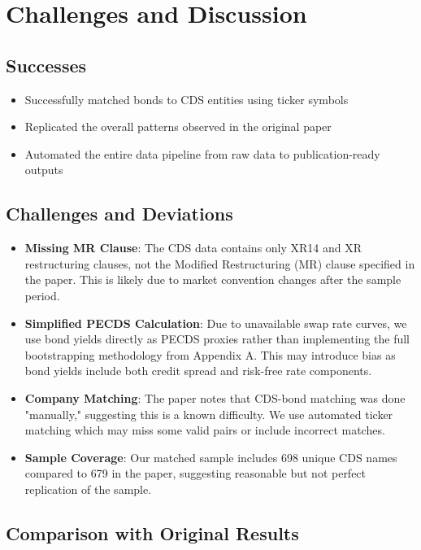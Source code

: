 \documentclass{article}
\begin{document}
\section{Challenges and Discussion}

\subsection{Successes}
\begin{itemize}
    \item Successfully matched bonds to CDS entities using ticker symbols
    \item Replicated the overall patterns observed in the original paper
    \item Automated the entire data pipeline from raw data to publication-ready outputs
\end{itemize}

\subsection{Challenges and Deviations}
\begin{itemize}
    \item \textbf{Missing MR Clause}: The CDS data contains only XR14 and XR restructuring clauses, not the Modified Restructuring (MR) clause specified in the paper. This is likely due to market convention changes after the sample period.
    
    \item \textbf{Simplified PECDS Calculation}: Due to unavailable swap rate curves, we use bond yields directly as PECDS proxies rather than implementing the full bootstrapping methodology from Appendix A. This may introduce bias as bond yields include both credit spread and risk-free rate components.
    
    \item \textbf{Company Matching}: The paper notes that CDS-bond matching was done "manually," suggesting this is a known difficulty. We use automated ticker matching which may miss some valid pairs or include incorrect matches.
    
    \item \textbf{Sample Coverage}: Our matched sample includes 698 unique CDS names compared to 679 in the paper, suggesting reasonable but not perfect replication of the sample.
\end{itemize}

\subsection{Comparison with Original Results}
\end{document}
